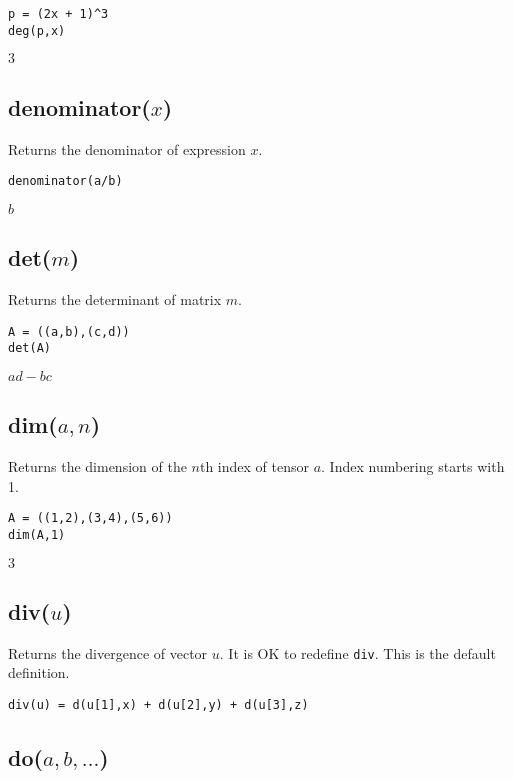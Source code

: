 {\color{blue}
\begin{verbatim}
p = (2x + 1)^3
deg(p,x)
\end{verbatim}
}

\noindent
$3$

\subsection*{denominator($x$)}

Returns the denominator of expression $x$.

{\color{blue}
\begin{verbatim}
denominator(a/b)
\end{verbatim}
}

\noindent
$b$

\subsection*{det($m$)}

Returns the determinant of matrix $m$.

{\color{blue}
\begin{verbatim}
A = ((a,b),(c,d))
det(A)
\end{verbatim}
}

\noindent
$a d - b c$

\subsection*{dim($a,n$)}

Returns the dimension of the $n$th index of tensor $a$.
Index numbering starts with 1.

{\color{blue}
\begin{verbatim}
A = ((1,2),(3,4),(5,6))
dim(A,1)
\end{verbatim}
}

\noindent
$3$

\subsection*{div($u$)}

Returns the divergence of vector $u$.
It is OK to redefine {\tt div}.
This is the default definition.

{\color{blue}
\begin{verbatim}
div(u) = d(u[1],x) + d(u[2],y) + d(u[3],z)
\end{verbatim}
}

\subsection*{do($a,b,\ldots$)}

